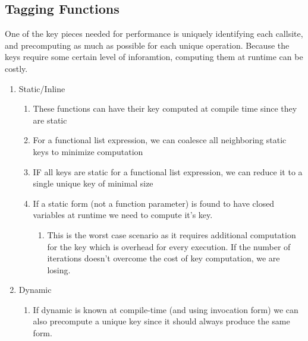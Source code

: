   \subsection{Tagging Functions}
  One of the key pieces needed for performance is uniquely identifying each callsite, and precomputing as much as possible for each unique operation.  Because the keys require some certain level of inforamtion, computing them at runtime can be costly.  

  \begin{enumerate}
    \item Static/Inline
      \begin{enumerate} 
        \item These functions can have their key computed at compile time since they are static
        \item For a functional list expression, we can coalesce all neighboring static keys to minimize computation
        \item IF all keys are static for a functional list expression, we can reduce it to a single unique key of minimal size
        \item If a static form (not a function parameter) is found to have closed variables at runtime we need to compute it's key. 
          \begin{enumerate}
            \item This is the worst case scenario as it requires additional computation for the key which is overhead for every execution.  If the number of iterations doesn't overcome the cost of key computation, we are losing.
          \end{enumerate}
      \end{enumerate}
    \item Dynamic
      \begin{enumerate} 
        \item If dynamic is known at compile-time (and using invocation form) we can also precompute a unique key since it should always produce the same form.
      \end{enumerate}
  \end{enumerate}